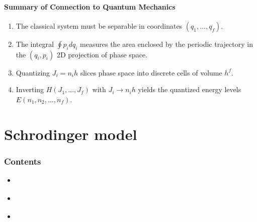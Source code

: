\documentclass[letterpaper,10pt,english]{jupyterBook}
\begin{document}
\paragraph{Summary of Connection to Quantum Mechanics}
\label{\detokenize{ch/quantum-mechanics/atom-models/analytical-mechanics-short:summary-of-connection-to-quantum-mechanics}}\begin{enumerate}
%
\item {} 
\sphinxAtStartPar
{} The classical system must be separable in coordinates \((q_1, \dots, q_f)\).

\item {} 
\sphinxAtStartPar
{} The integral \(\oint p_i dq_i\) measures the area enclosed by the periodic trajectory in the \((q_i, p_i)\) 2D projection of phase space.

\item {} 
\sphinxAtStartPar
{} Quantizing \(J_i = n_i h\) slices phase space into discrete cells of volume \(h^f\).

\item {} 
\sphinxAtStartPar
{} Inverting \(H(J_1, \dots, J_f)\) with \(J_i \to n_i h\) yields the quantized energy levels \(E(n_1, n_2, \dots, n_f)\).

\end{enumerate}

\sphinxstepscope


\section{Schrodinger model}
\label{\detokenize{ch/quantum-mechanics/atom-models/schrodinger:schrodinger-model}}\label{\detokenize{ch/quantum-mechanics/atom-models/schrodinger:quantum-mechanics-atom-models-schrodinger}}\label{\detokenize{ch/quantum-mechanics/atom-models/schrodinger::doc}}\subsubsection*{Contents}
\begin{itemize}
\item {} 
\sphinxAtStartPar
{\hyperref[\detokenize{ch/quantum-mechanics/atom-models/schrodinger-analytical-sln:quantum-mechanics-atom-models-schrodinger-analytical-sln}]{}}

\item {} 
\sphinxAtStartPar
{\hyperref[\detokenize{ch/quantum-mechanics/atom-models/schrodinger-gallery:quantum-mechanics-atom-models-schrodinger-gallery}]{}}

\item {} 
\sphinxAtStartPar
{\hyperref[\detokenize{ch/quantum-mechanics/atom-models/schrodinger-notes:quantum-mechanics-atom-models-schrodinger-notes}]{}}

\end{itemize}
\end{document}
